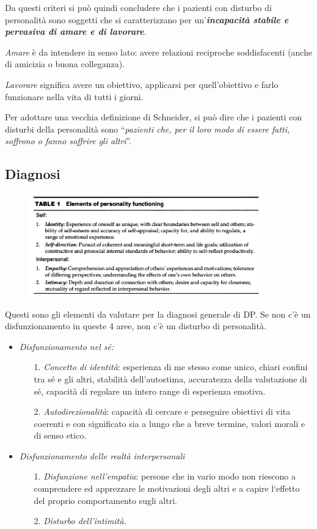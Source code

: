 Da questi criteri si può quindi concludere che i pazienti con disturbo
di personalità sono soggetti che si caratterizzano per
un'\textbf{\emph{incapacità stabile e pervasiva di amare e di
lavorare}}.

\emph{Amare} è da intendere in senso lato: avere relazioni reciproche
soddisfacenti (anche di amicizia o buona colleganza).

\emph{Lavorare} significa avere un obiettivo, applicarsi per
quell'obiettivo e farlo funzionare nella vita di tutti i giorni.

Per adottare una vecchia definizione di Schneider, si può dire che i
pazienti con disturbi della personalità sono ``\emph{pazienti che, per
il loro modo di essere fatti, soffrono o fanno soffrire gli altri}''.

\subsection{Diagnosi}

\begin{figure}[!ht]
\centering
	\includegraphics[width=0.9\textwidth]{011/image3.png}
\end{figure}

Questi
sono gli elementi da valutare per la diagnosi generale di DP. Se non c'è
un disfunzionamento in queste 4 aree, non c'è un disturbo di
personalità.

\begin{itemize}
\item
  \emph{Disfunzionamento nel sé:}
\begin{itemize}
\item[1.]
  \emph{Concetto di identità}: esperienza di me stesso come unico,
  chiari confini tra sé e gli altri, stabilità dell'autostima,
  accuratezza della valutazione di sé, capacità di regolare un intero
  range di esperienza emotiva.
\item[2.]
  \emph{Autodirezionalità}: capacità di cercare e perseguire obiettivi
  di vita coerenti e con significato sia a lungo che a breve termine,
  valori morali e di senso etico.
\end{itemize}
\item
  \emph{Disfunzionamento delle realtà interpersonali}
\begin{itemize}
\item[1.]
  \emph{Disfunzione nell'empatia}: persone che in vario modo non
  riescono a comprendere ed apprezzare le motivazioni degli altri e a
  capire l`effetto del proprio comportamento sugli altri.
\item[2.]
  \emph{Disturbo dell'intimità.}
\end{itemize}
\end{itemize}

